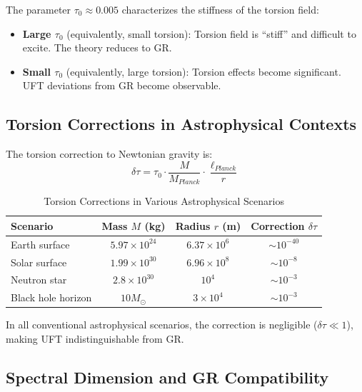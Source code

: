 The parameter $\tau_0 \approx 0.005$ characterizes the stiffness of the torsion field:

\begin{itemize}
    \item \textbf{Large $\tau_0$} (equivalently, small torsion): Torsion field is ``stiff'' and difficult to excite. The theory reduces to GR.
    \item \textbf{Small $\tau_0$} (equivalently, large torsion): Torsion effects become significant. UFT deviations from GR become observable.
\end{itemize}

\subsection{Torsion Corrections in Astrophysical Contexts}

The torsion correction to Newtonian gravity is:
\begin{equation}
    \delta\tau = \tau_0 \cdot \frac{M}{M_{Planck}} \cdot \frac{\ell_{Planck}}{r}
    \label{eq:torsion_correction}
\end{equation}

\begin{table}[htbp]
\centering
\caption{Torsion Corrections in Various Astrophysical Scenarios}
\begin{tabular}{@{}lccc@{}}
\toprule
Scenario & Mass $M$ (kg) & Radius $r$ (m) & Correction $\delta\tau$ \\
\midrule
Earth surface & $5.97 \times 10^{24}$ & $6.37 \times 10^6$ & $\sim 10^{-40}$ \\
Solar surface & $1.99 \times 10^{30}$ & $6.96 \times 10^8$ & $\sim 10^{-8}$ \\
Neutron star & $2.8 \times 10^{30}$ & $10^4$ & $\sim 10^{-3}$ \\
Black hole horizon & $10M_\odot$ & $3 \times 10^4$ & $\sim 10^{-3}$ \\
\bottomrule
\end{tabular}
\label{tab:torsion_corrections}
\end{table}

In all conventional astrophysical scenarios, the correction is negligible ($\delta\tau \ll 1$), making UFT indistinguishable from GR.

\subsection{Spectral Dimension and GR Compatibility}

